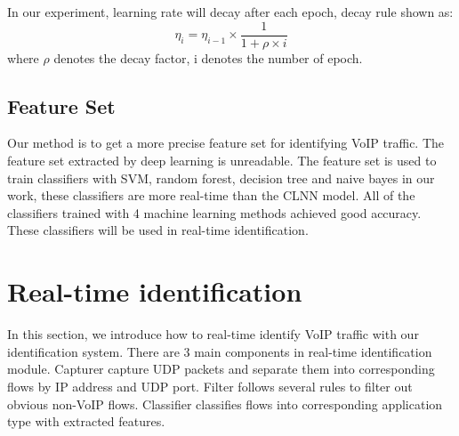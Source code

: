 \documentclass[conference]{IEEEtran}
\begin{document}
In our experiment, learning rate will decay after each epoch, decay rule shown as:
\begin{equation}
{\eta _i} = {\eta _{i - 1}} \times \frac{1}{{1 + \rho  \times i}}
\end{equation}
where ${\rho }$ denotes the decay factor, i denotes the number of epoch.

\subsection{Feature Set}
Our method is to get a more precise feature set for identifying VoIP traffic. The feature set extracted by deep learning is unreadable. The feature set is used to train classifiers with SVM, random forest, decision tree and naive bayes in our work, these classifiers are more real-time than the CLNN model. All of the classifiers trained with 4 machine learning methods achieved good accuracy. These classifiers will be used in real-time identification. 

\section{Real-time identification}
\label{sec:realtimeidentification}

In this section, we introduce how to real-time identify VoIP traffic with our identification system. There are 3 main components in real-time identification module. Capturer capture UDP packets and separate them into corresponding flows by IP address and UDP port. Filter follows several rules to filter out obvious non-VoIP flows. Classifier classifies flows into corresponding application type with extracted features.


\end{document}
